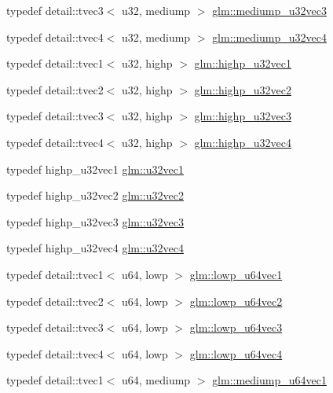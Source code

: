 \begin{CompactItemize}
\item 
typedef detail::tvec3$<$ u32, mediump $>$ \hyperlink{group__gtc__type__precision_g84a903ce8834b22f78d80a64eb0181bb}{glm::mediump\_\-u32vec3}
\item 
typedef detail::tvec4$<$ u32, mediump $>$ \hyperlink{group__gtc__type__precision_g532f59ac4c36a7e1371341165f7be33b}{glm::mediump\_\-u32vec4}
\item 
typedef detail::tvec1$<$ u32, highp $>$ \hyperlink{group__gtc__type__precision_g8a92d1f79e2fd4a03be803e35aac8e1b}{glm::highp\_\-u32vec1}
\item 
typedef detail::tvec2$<$ u32, highp $>$ \hyperlink{group__gtc__type__precision_gddb81e8e12bd640e188744ed372c95bb}{glm::highp\_\-u32vec2}
\item 
typedef detail::tvec3$<$ u32, highp $>$ \hyperlink{group__gtc__type__precision_gb1e386f5e415e00f800edf5d15207286}{glm::highp\_\-u32vec3}
\item 
typedef detail::tvec4$<$ u32, highp $>$ \hyperlink{group__gtc__type__precision_g9418a8d549d344d4f7b7158771a2fdfe}{glm::highp\_\-u32vec4}
\item 
typedef highp\_\-u32vec1 \hyperlink{group__gtc__type__precision_gc8263c8c0bb36bc5c3d109f508e0fb41}{glm::u32vec1}
\item 
typedef highp\_\-u32vec2 \hyperlink{group__gtc__type__precision_ga543e17450ca67dee12e2c41badfb3a7}{glm::u32vec2}
\item 
typedef highp\_\-u32vec3 \hyperlink{group__gtc__type__precision_g7c88634a005904a441cba739d7cc4055}{glm::u32vec3}
\item 
typedef highp\_\-u32vec4 \hyperlink{group__gtc__type__precision_g7e4574f8327a2f576baf2617343d0170}{glm::u32vec4}
\item 
typedef detail::tvec1$<$ u64, lowp $>$ \hyperlink{group__gtc__type__precision_gcd97dc5e92d0e2f6f6d62a5160508e2a}{glm::lowp\_\-u64vec1}
\item 
typedef detail::tvec2$<$ u64, lowp $>$ \hyperlink{group__gtc__type__precision_ge0e7d3ed32e8e79b4f6dd0c9baafcaea}{glm::lowp\_\-u64vec2}
\item 
typedef detail::tvec3$<$ u64, lowp $>$ \hyperlink{group__gtc__type__precision_ga62794e3f055a333a85c0e52376f2429}{glm::lowp\_\-u64vec3}
\item 
typedef detail::tvec4$<$ u64, lowp $>$ \hyperlink{group__gtc__type__precision_g1dc6d791a39dc52ee296a891d5b9b084}{glm::lowp\_\-u64vec4}
\item 
typedef detail::tvec1$<$ u64, mediump $>$ \hyperlink{group__gtc__type__precision_gf4211dc9e211d57b34b45a612b6de193}{glm::mediump\_\-u64vec1}

\end{CompactItemize}
